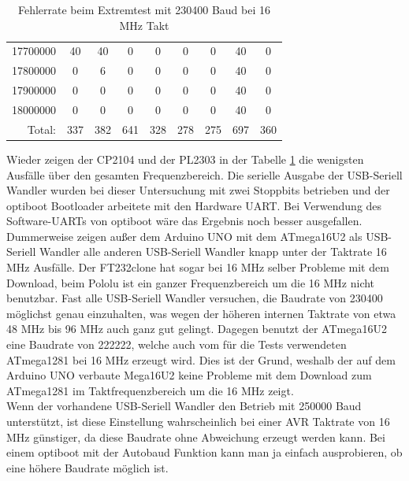 \begin{table}[H]
\begin{center}
\begin{tabular}{| c | c | c | c | c | c | c | c | c |}
17700000       &  40     &  40    &  0     & 0      & 0      & 0      & 40     & 0 \\
17800000       &  0      &  6     &  0     & 0      & 0      & 0      & 40     & 0 \\
17900000       &  0      &  0     &  0     & 0      & 0      & 0      & 40     & 0 \\
18000000       &  0      &  0     &  0     & 0      & 0      & 0      & 40     & 0 \\
    \hline
\multicolumn{1}{|r|}{Total:} &  337    &  382   &  641   & 328    & 278    & 275    & 697    & 360 \\
    \hline
    \end{tabular}
  \end{center}
  \caption{Fehlerrate beim Extremtest mit 230400 Baud bei 16 MHz Takt}
  \label{tab:ExtremErrs16}
\end{table}

Wieder zeigen der CP2104 und der PL2303 in der Tabelle \ref{tab:ExtremErrs16} die wenigsten Ausfälle
über den gesamten Frequenzbereich.
Die serielle Ausgabe der USB-Seriell Wandler wurden bei dieser Untersuchung mit zwei Stoppbits betrieben
und der optiboot Bootloader arbeitete mit den Hardware UART. Bei Verwendung des Software-UARTs
von optiboot wäre das Ergebnis noch besser ausgefallen.
Dummerweise zeigen außer dem Arduino UNO mit dem ATmega16U2 als USB-Seriell Wandler alle anderen
USB-Seriell Wandler knapp unter der Taktrate 16 MHz Ausfälle. Der FT232clone hat sogar bei 16 MHz
selber Probleme mit dem Download, beim Pololu ist ein ganzer Frequenzbereich um die 16 MHz nicht
benutzbar. Fast alle USB-Seriell Wandler versuchen, die Baudrate von 230400 möglichst genau
einzuhalten, was wegen der höheren internen Taktrate von etwa 48 MHz bis 96 MHz auch ganz gut gelingt.
Dagegen benutzt der ATmega16U2 eine Baudrate von 222222, welche auch vom für die Tests verwendeten ATmega1281
bei 16 MHz erzeugt wird.
Dies ist der Grund, weshalb der auf dem Arduino UNO verbaute Mega16U2 
keine Probleme mit dem Download zum ATmega1281 im Taktfrequenzbereich um die 16 MHz zeigt.\\

Wenn der vorhandene USB-Seriell Wandler den Betrieb mit 250000 Baud unterstützt, ist diese Einstellung
wahrscheinlich bei einer AVR Taktrate von 16 MHz günstiger, da diese Baudrate ohne Abweichung erzeugt
werden kann.
Bei einem optiboot mit der Autobaud Funktion kann man ja einfach ausprobieren,
ob eine höhere Baudrate möglich ist.


